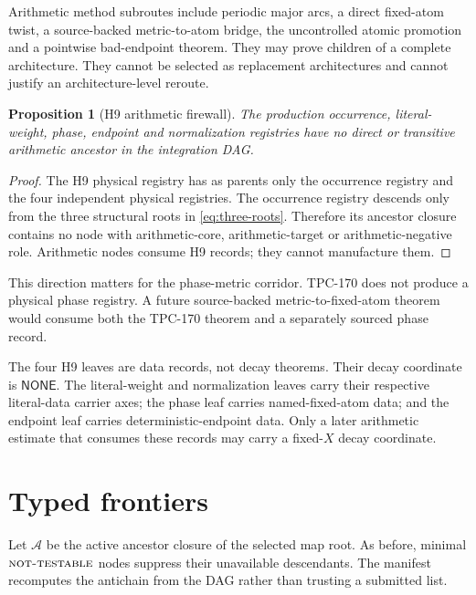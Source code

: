 \documentclass[11pt]{article}
\newtheorem{proposition}[theorem]{Proposition}
\theoremstyle{definition}
\theoremstyle{remark}
\newcommand{\NT}{\textnormal{\textsc{not-testable}}}
\begin{document}
Arithmetic method subroutes include periodic major arcs, a direct
fixed-atom twist, a source-backed metric-to-atom bridge, the
uncontrolled atomic promotion and a pointwise bad-endpoint theorem.
They may prove children of a complete architecture.  They cannot be
selected as replacement architectures and cannot justify an
architecture-level reroute.

\begin{proposition}[H9 arithmetic firewall]
\label{prop:h9}
The production occurrence, literal-weight, phase, endpoint and
normalization registries have no direct or transitive arithmetic
ancestor in the integration DAG.
\end{proposition}

\begin{proof}
The H9 physical registry has as parents only the occurrence registry
and the four independent physical registries.  The occurrence
registry descends only from the three structural roots in
\eqref{eq:three-roots}.  Therefore its ancestor closure contains no
node with arithmetic-core, arithmetic-target or
arithmetic-negative role.  Arithmetic nodes consume H9 records; they
cannot manufacture them.
\end{proof}

This direction matters for the phase-metric corridor.  TPC-170 does
not produce a physical phase registry.  A future source-backed
metric-to-fixed-atom theorem would consume both the TPC-170 theorem
and a separately sourced phase record.

The four H9 leaves are data records, not decay theorems.  Their decay
coordinate is \(\mathsf{NONE}\).  The literal-weight and normalization
leaves carry their respective literal-data carrier axes; the phase
leaf carries named-fixed-atom data; and the endpoint leaf carries
deterministic-endpoint data.  Only a later arithmetic estimate that
consumes these records may carry a fixed-\(X\) decay coordinate.

\section{Typed frontiers}

Let \(\mathcal A\) be the active ancestor closure of the selected map
root.  As before, minimal \(\NT\) nodes suppress their unavailable
descendants.  The manifest recomputes the antichain from the DAG
rather than trusting a submitted list.
\end{document}
